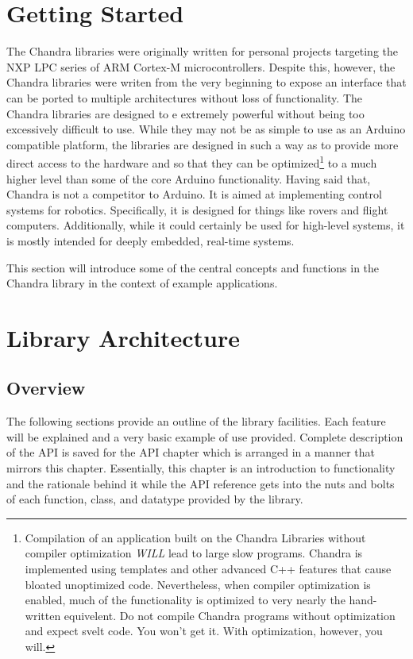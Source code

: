 \documentclass[12pt,letterpaper,article]{memoir} %
\begin{document}
\chapter{Getting Started}
The Chandra libraries were originally written for personal projects targeting the NXP LPC series of ARM Cortex-M microcontrollers.  Despite this, however, the Chandra libraries were writen from the very beginning to expose an interface that can be ported to multiple architectures without loss of functionality.  The Chandra libraries are designed to e extremely powerful without being too excessively difficult to use.  While they may not be as simple to use as an Arduino compatible platform, the libraries are designed in such a way as to provide more direct access to the hardware and so that they can be optimized\footnote{Compilation of an application built on the Chandra Libraries without compiler optimization \emph{WILL} lead to large slow programs.  Chandra is implemented using templates and other advanced C++ features that cause bloated unoptimized code.  Nevertheless, when compiler optimization is enabled, much of the functionality is optimized to very nearly the hand-written equivelent.  Do not compile Chandra programs without optimization and expect svelt code.  You won't get it.  With optimization, however, you will.} to a much higher level than some of the core Arduino functionality.  Having said that, Chandra is not a competitor to Arduino.  It is aimed at implementing control systems for robotics.  Specifically, it is designed for things like rovers and flight computers.  Additionally, while it could certainly be used for high-level systems, it is mostly intended for deeply embedded, real-time systems.

This section will introduce some of the central concepts and functions in the Chandra library in the context of example applications.  

\section{}
\subsection{}

\chapter{Library Architecture}
\section{Overview}
The following sections provide an outline of the library facilities.  Each feature will be explained and a very basic example of use provided.  Complete description of the API is saved for the API chapter which is arranged in a manner that mirrors this chapter.  Essentially, this chapter is an introduction to functionality and the rationale behind it while the API reference gets into the nuts and bolts of each function, class, and datatype provided by the library.
\end{document}
